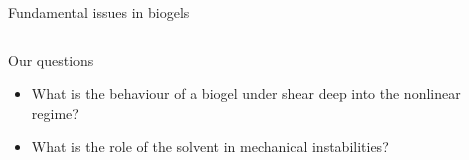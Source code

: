 \documentclass[xcolor=table]{beamer}
\begin{document}
\begin{frame}{Fundamental issues in biogels}
\begin{tabu}{X[c]X[c]}
\end{tabu}
\begin{block}{Our questions}
\begin{itemize}
\item What is the behaviour of a biogel under shear deep into the nonlinear regime?
\item What is the role of the solvent in mechanical instabilities?
\end{itemize}
\end{block}
\end{frame}



\end{document}
